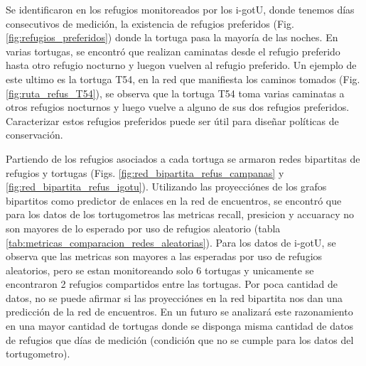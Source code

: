 Se identificaron en los refugios monitoreados por los i-gotU, donde tenemos días consecutivos de medición, la existencia de refugios preferidos (Fig. \ref{fig:refugios_preferidos}) donde la tortuga pasa la mayoría de las noches. En varias tortugas, se encontró que realizan caminatas desde el refugio preferido hasta otro refugio nocturno y luegon vuelven al refugio preferido. Un ejemplo de este ultimo es la tortuga T54, en la red que manifiesta los caminos tomados (Fig. \ref{fig:ruta_refus_T54}), se observa que la tortuga T54 toma varias caminatas a otros refugios nocturnos y luego vuelve a alguno de sus dos refugios preferidos. Caracterizar estos refugios preferidos puede ser útil para diseñar políticas de conservación.

Partiendo de los refugios asociados a cada tortuga se armaron redes bipartitas de refugios y tortugas (Figs. \ref{fig:red_bipartita_refus_campanas} y \ref{fig:red_bipartita_refus_igotu}). Utilizando las proyecciónes de los grafos bipartitos como predictor de enlaces en la red de encuentros, se encontró que para los datos de los tortugometros las metricas recall, presicion y accuaracy no son mayores de lo esperado por uso de refugios aleatorio (tabla \ref{tab:metricas_comparacion_redes_aleatorias}). Para los datos de i-gotU, se observa que las metricas son mayores a las esperadas por uso de refugios aleatorios, pero se estan monitoreando solo 6 tortugas y unicamente se encontraron 2 refugios compartidos entre las tortugas. Por poca cantidad de datos, no se puede afirmar si las proyecciónes en la red bipartita nos dan una predicción de la red de encuentros. En un futuro se analizará este razonamiento en una mayor cantidad de tortugas donde se disponga misma cantidad de datos de refugios que días de medición (condición que no se cumple para los datos del tortugometro).









 
 